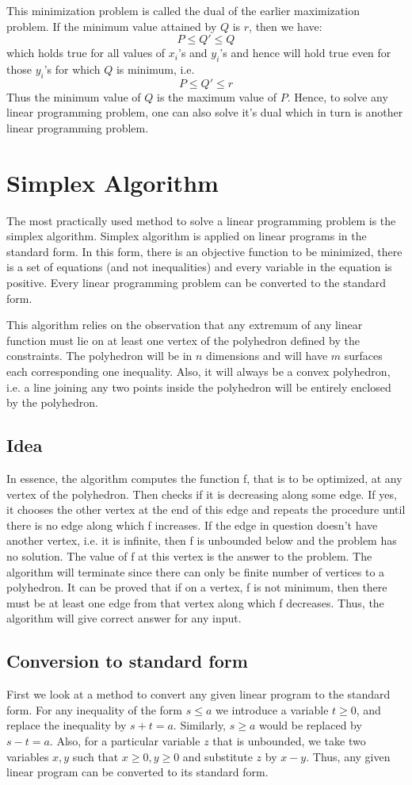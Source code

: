 This minimization problem is called the dual of the earlier maximization problem. If the minimum value attained by $Q$ is $r$, then we have:
\[ P \leqslant Q' \leqslant Q \]
which holds true for all values of $x_i$'s and $y_i$'s and hence will hold true even for those $y_i$'s for which $Q$ is minimum, i.e.
\[P \leqslant Q' \leqslant r \]
Thus the minimum value of $Q$ is the maximum value of $P$. Hence, to solve any linear programming problem, one can also solve it's dual which in turn is another linear programming problem.

\section{Simplex Algorithm}
The most practically used method to solve a linear programming problem is the simplex algorithm. Simplex algorithm is applied on linear programs in the standard form. In this form, there is an objective function to be minimized, there is a set of equations (and not inequalities) and every variable in the equation is positive. Every linear programming problem can be converted to the standard form.

This algorithm relies on the observation that any extremum of any linear function must lie on at least one vertex of the polyhedron defined by the constraints. The polyhedron will be in $n$ dimensions and will have $m$ surfaces each corresponding one inequality. Also, it will always be a convex polyhedron, i.e. a line joining any two points inside the polyhedron will be entirely enclosed by the polyhedron.
\subsection{Idea}
In essence, the algorithm computes the function f, that is to be optimized, at any vertex of the polyhedron. Then checks if it is decreasing along some edge. If yes, it chooses the other vertex at the end of this edge and repeats the procedure until there is no edge along which f increases. If the edge in question doesn't have another vertex, i.e. it is infinite, then f is unbounded below and the problem has no solution. The value of f at this vertex is the answer to the problem. The algorithm will terminate since there can only be finite number of vertices to a polyhedron. It can be proved that if on a vertex, f is not minimum, then there must be at least one edge from that vertex along which f decreases. Thus, the algorithm will give correct answer for any input.
\subsection{Conversion to standard form}
First we look at a method to convert any given linear program to the standard form. For any inequality of the form $ s \leqslant a$ we introduce a variable $t \geqslant 0$, and replace the inequality by $s+t = a$. Similarly, $s \geqslant a$ would be replaced by $s-t=a$. Also, for a particular variable $z$ that is unbounded, we take two variables $x, y$ such that $x\geqslant 0, y \geqslant 0$ and substitute $z$ by $x-y$. Thus, any given linear program can be converted to its standard form.
